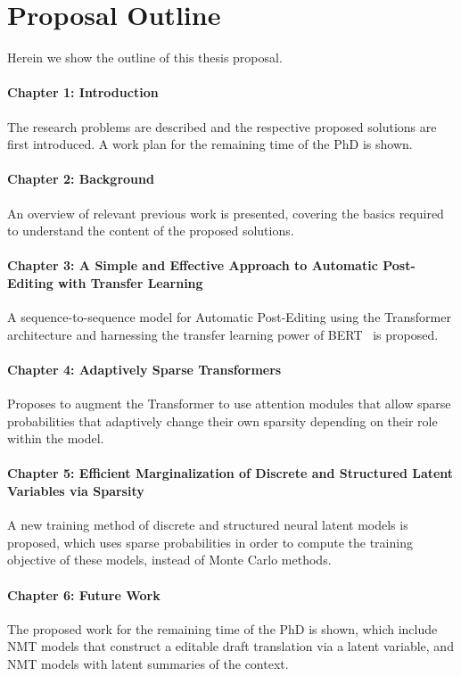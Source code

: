 \section{Proposal Outline}
\label{sec:int_outline}

Herein we show the outline of this thesis proposal.

\paragraph*{Chapter 1: Introduction} The research problems are
described and the respective proposed solutions are first introduced.
A work plan for the remaining time of the PhD is shown.

\paragraph*{Chapter 2: Background} An overview of relevant previous
work is presented, covering the basics required to understand
the content of the proposed solutions.

\paragraph*{Chapter 3: A Simple and Effective Approach to Automatic
Post-Editing with Transfer Learning} A sequence-to-sequence model for
Automatic Post-Editing using the Transformer architecture and
harnessing the transfer learning power of BERT~\citep{devlin2018bert}
is proposed.

\paragraph*{Chapter 4: Adaptively Sparse Transformers} Proposes to
augment the Transformer to use attention modules that allow sparse
probabilities that adaptively change their own sparsity depending on
their role within the model.

\paragraph*{Chapter 5: Efficient Marginalization of Discrete and
Structured Latent Variables via Sparsity} A new training method of
discrete and structured neural latent models is proposed, which uses
sparse probabilities in order to compute the training objective of
these models, instead of Monte Carlo methods.

\paragraph*{Chapter 6: Future Work} The proposed work for the
remaining time of the PhD is shown, which include NMT models that
construct a editable draft translation via a latent variable, and
NMT models with latent summaries of the context.